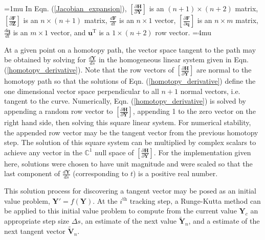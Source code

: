 \documentclass[journal]{IEEEtran}
\begin{document}
\medmuskip=1mu
In Eqn. (\ref{Jacobian_expansion}), $\left[ \frac{\partial \mathbf{H}}{\partial \mathbf{Y}} \right]$ is an $(n+1) \times (n+2)$ matrix, $\left[ \frac{\partial \mathbf{F}}{\partial \mathbf{Z}} \right]$ is an $n \times (n+1)$ matrix, $\frac{d\mathbf{F}}{dt}$ is an $n \times 1$ vector, $\left[ \frac{\partial \mathbf{F}}{\partial \mathbf{q}} \right]$ is an $n \times m$ matrix, $\frac{d\mathbf{q}}{dt}$ is an $m \times 1$ vector, and $\mathbf{u}^\text{T}$ is a $1 \times (n+2)$ row vector.
\medmuskip=4mu

%

At a given point on a homotopy path, the vector space tangent to the path may be obtained by solving for $\frac{d\mathbf{Y}}{ds}$ in the homogeneous linear system given in Eqn. (\ref{homotopy_derivative}).
Note that the row vectors of $\left[ \frac{\partial \mathbf{H}}{\partial \mathbf{Y}} \right]$ are normal to the homotopy path so that the solutions of Eqn. (\ref{homotopy_derivative}) define the one dimensional vector space perpendicular to all $n+1$ normal vectors, i.e. tangent to the curve.
Numerically, Eqn. (\ref{homotopy_derivative}) is solved by appending a random row vector to $\left[ \frac{\partial \mathbf{H}}{\partial \mathbf{Y}} \right]$, appending 1 to the zero vector on the right hand side, then solving this square linear system.
For numerical stability, the appended row vector may be the tangent vector from the previous homotopy step.
The solution of this square system can be multiplied by complex scalars to achieve any vector in the $\mathbb{C}^1$ null space of $\left[ \frac{\partial \mathbf{H}}{\partial \mathbf{Y}} \right]$.
For the implementation given here, solutions were chosen to have unit magnitude and were scaled so that the last component of $\frac{d\mathbf{Y}}{ds}$ (corresponding to $t$) is a positive real number.


This solution process for discovering a tangent vector may be posed as an initial value problem, $\mathbf{Y}' = f(\mathbf{Y})$.
At the $i^\text{th}$ tracking step, a Runge-Kutta method can be applied to this initial value problem to compute from the current value $\mathbf{Y}_c$ an appropriate step size $\Delta s$, an estimate of the next value $\tilde{\mathbf{Y}}_n$, and a estimate of the next tangent vector $\tilde{\mathbf{V}}_n$.
\end{document}
